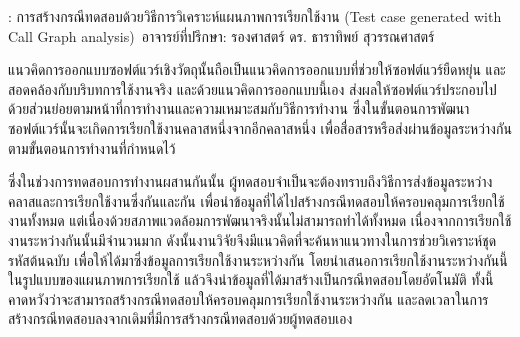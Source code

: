 
\begin{abstractquote}
\studentname : การสร้างกรณีทดสอบด้วยวิธีการวิเคราะห์แผนภาพการเรียกใช้งาน
(Test case generated with Call Graph analysis)
\,อาจารย์ที่ปรึกษา: รองศาสตร์ ดร. ธาราทิพย์ สุวรรณศาสตร์
\end{abstractquote}

แนวคิดการออกแบบซอฟต์แวร์เชิงวัตถุนั้นถือเป็นแนวคิดการออกแบบที่ช่วยให้ซอฟต์แวร์ยืดหยุ่น และสอดคล้องกับบริบทการใช้งานจริง
และด้วยแนวคิดการออกแบบนี้เอง ส่งผลให้ซอฟต์แวร์ประกอบไปด้วยส่วนย่อยตามหน้าที่การทำงานและความเหมาะสมกับวิธีการทำงาน
ซึ่งในขั้นตอนการพัฒนาซอฟต์แวร์นั้นจะเกิดการเรียกใช้งานคลาสหนึ่งจากอีกคลาสหนึ่ง เพื่อสื่อสารหรือส่งผ่านข้อมูลระหว่างกัน
ตามขั้นตอนการทำงานที่กำหนดไว้

ซึ่งในช่วงการทดสอบการทำงานผสานกันนั้น ผู้ทดสอบจำเป็นจะต้องทราบถึงวิธีการส่งข้อมูลระหว่างคลาสและการเรียกใช้งานซึ่งกันและกัน
เพื่อนำข้อมูลที่ได้ไปสร้างกรณีทดสอบให้ครอบคลุมการเรียกใช้งานทั้งหมด แต่เนื่องด้วยสภาพแวดล้อมการพัฒนาจริงนั้นไม่สามารถทำได้ทั้งหมด
เนื่องจากการเรียกใช้งานระหว่างกันนั้นมีจำนวนมาก ดังนั้นงานวิจัยจึงมีแนวคิดที่จะค้นหาแนวทางในการช่วยวิเคราะห์ชุดรหัสต้นฉบับ 
เพื่อให้ได้มาซึ่งข้อมูลการเรียกใช้งานระหว่างกัน โดยนำเสนอการเรียกใช้งานระหว่างกันนี้ในรูปแบบของแผนภาพการเรียกใช้
แล้วจึงนำข้อมูลที่ได้มาสร้างเป็นกรณีทดสอบโดยอัตโนมัติ ทั้งนี้คาดหวังว่าจะสามารถสร้างกรณีทดสอบให้ครอบคลุมการเรียกใช้งานระหว่างกัน
และลดเวลาในการสร้างกรณีทดสอบลงจากเดิมที่มีการสร้างกรณีทดสอบด้วยผู้ทดสอบเอง
